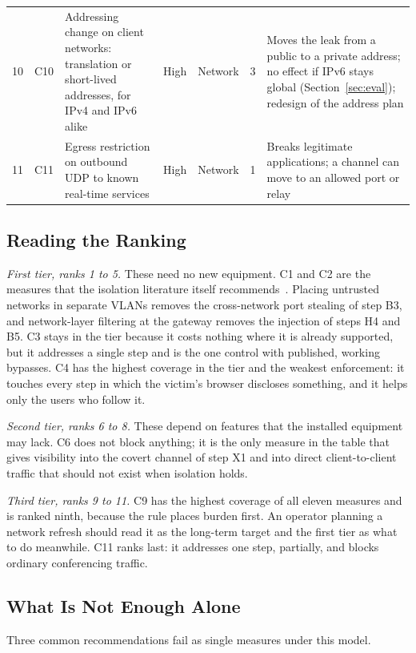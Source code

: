\documentclass[conference]{IEEEtran}
\begin{document}
\begin{table}[t]
\begin{tabularx}{\textwidth}{@{}L{0.55cm}L{0.5cm}L{4.2cm}L{1.0cm}L{1.5cm}L{1.15cm}Y@{}}
10 & C10 & Addressing change on client networks: translation or short-lived addresses, for IPv4 and IPv6 alike & High & Network & 3 & Moves the leak from a public to a private address; no effect if IPv6 stays global (Section~\ref{sec:eval}); redesign of the address plan \\
11 & C11 & Egress restriction on outbound UDP to known real-time services & High & Network & 1 & Breaks legitimate applications; a channel can move to an allowed port or relay \\
\bottomrule
\end{tabularx}
\end{table}

\subsection{Reading the Ranking}
\textit{First tier, ranks 1 to 5.} These need no new equipment. C1 and C2 are the measures that the isolation literature itself recommends~\cite{airsnitch2026}. Placing untrusted networks in separate VLANs removes the cross-network port stealing of step B3, and network-layer filtering at the gateway removes the injection of steps H4 and B5. C3 stays in the tier because it costs nothing where it is already supported, but it addresses a single step and is the one control with published, working bypasses. C4 has the highest coverage in the tier and the weakest enforcement: it touches every step in which the victim's browser discloses something, and it helps only the users who follow it.

\textit{Second tier, ranks 6 to 8.} These depend on features that the installed equipment may lack. C6 does not block anything; it is the only measure in the table that gives visibility into the covert channel of step X1 and into direct client-to-client traffic that should not exist when isolation holds.

\textit{Third tier, ranks 9 to 11.} C9 has the highest coverage of all eleven measures and is ranked ninth, because the rule places burden first. An operator planning a network refresh should read it as the long-term target and the first tier as what to do meanwhile. C11 ranks last: it addresses one step, partially, and blocks ordinary conferencing traffic.

\subsection{What Is Not Enough Alone}
Three common recommendations fail as single measures under this model.
\end{document}
